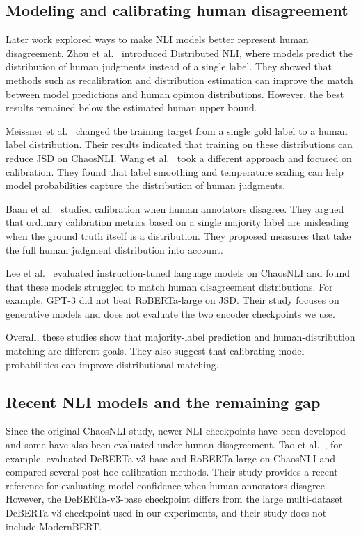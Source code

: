\documentclass[11pt,a4paper]{article}
\begin{document}
\subsection{Modeling and calibrating human disagreement}

Later work explored ways to make NLI models better represent human disagreement. Zhou et al.\ \cite{zhou2022distributed} introduced Distributed NLI, where models predict the distribution of human judgments instead of a single label. They showed that methods such as recalibration and distribution estimation can improve the match between model predictions and human opinion distributions. However, the best results remained below the estimated human upper bound.

Meissner et al.\ \cite{meissner2021capturing} changed the training target from a single gold label to a human label distribution. Their results indicated that training on these distributions can reduce JSD on ChaosNLI. Wang et al.\ \cite{wang2022calibrated} took a different approach and focused on calibration. They found that label smoothing and temperature scaling can help model probabilities capture the distribution of human judgments.

Baan et al.\ \cite{baan2022stop} studied calibration when human annotators disagree. They argued that ordinary calibration metrics based on a single majority label are misleading when the ground truth itself is a distribution. They proposed measures that take the full human judgment distribution into account.

Lee et al.\ \cite{lee2023dissenting} evaluated instruction-tuned language models on ChaosNLI and found that these models struggled to match human disagreement distributions. For example, GPT-3 did not beat RoBERTa-large on JSD. Their study focuses on generative models and does not evaluate the two encoder checkpoints we use.

Overall, these studies show that majority-label prediction and human-distribution matching are different goals. They also suggest that calibrating model probabilities can improve distributional matching.

\subsection{Recent NLI models and the remaining gap}

Since the original ChaosNLI study, newer NLI checkpoints have been developed and some have also been evaluated under human disagreement. Tao et al.\ \cite{tao2026confidence}, for example, evaluated DeBERTa-v3-base and RoBERTa-large on ChaosNLI and compared several post-hoc calibration methods. Their study provides a recent reference for evaluating model confidence when human annotators disagree. However, the DeBERTa-v3-base checkpoint differs from the large multi-dataset DeBERTa-v3 checkpoint used in our experiments, and their study does not include ModernBERT.
\end{document}
